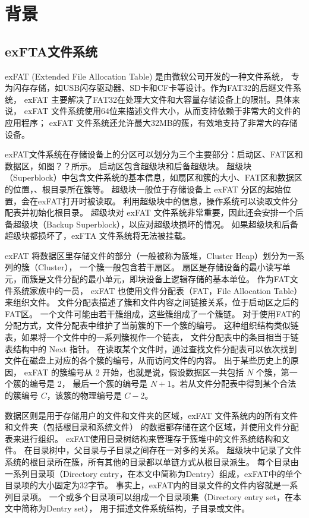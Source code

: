 
\chapter{背景}
\section{exFTA文件系统}
exFAT (Extended File Allocation Table)\parencite{exFAT} 是由微软公司开发的一种文件系统，
专为闪存存储，如USB闪存驱动器、SD卡和CF卡等设计。作为FAT32的后继文件系统，
exFAT 主要解决了FAT32在处理大文件和大容量存储设备上的限制。具体来说，
exFAT 文件系统使用64位来描述文件大小，从而支持依赖于非常大的文件的应用程序；
exFAT 文件系统还允许最大32MB的簇，有效地支持了非常大的存储设备。

exFAT文件系统在存储设备上的分区可以划分为三个主要部分：启动区、FAT区和数据区，如图？？所示。
启动区包含超级块和后备超级块。
超级块（Superblock）中包含文件系统的基本信息，如扇区和簇的大小、FAT区和数据区的位置，、根目录所在簇等。
超级块一般位于存储设备上 exFAT 分区的起始位置，会在exFAT打开时被读取。
利用超级块中的信息，操作系统可以读取文件分配表并初始化根目录。
超级块对 exFAT 文件系统非常重要，因此还会安排一个后备超级块（Backup Superblock），以应对超级块损坏的情况。
如果超级块和后备超级块都损坏了，exFTA 文件系统将无法被挂载。

exFAT 将数据区里存储文件的部分（一般被称为簇堆，Cluster Heap）划分为一系列的簇（Cluster），
一个簇一般包含若干扇区。
扇区是存储设备的最小读写单元，而簇是文件分配的最小单元，即块设备上逻辑存储的基本单位。
作为FAT文件系统家族中的一员， exFAT 也使用文件分配表（FAT，File Allocation Table）来组织文件。
文件分配表描述了簇和文件内容之间链接关系，位于启动区之后的FAT区。
一个文件可能由若干簇组成，这些簇组成了一个簇链。
对于使用FAT的分配方式，文件分配表中维护了当前簇的下一个簇的编号。
这种组织结构类似链表，如果将一个文件中的一系列簇视作一个链表，
文件分配表中的条目相当于链表结构中的 Next 指针。
在读取某个文件时，通过查找文件分配表可以依次找到文件在磁盘上对应的各个簇的编号，从而访问文件的内容。
出于某些历史上的原因， exFAT 的簇编号从 2 开始，也就是说，假设数据区一共包括 $ N $ 个簇，第一个簇的编号是 2，
最后一个簇的编号是 $ N + 1 $。若从文件分配表中得到某个合法的簇编号 $ C $，该簇的物理编号是 $ C - 2 $。

数据区则是用于存储用户的文件和文件夹的区域，exFAT 文件系统内的所有文件和文件夹（包括根目录和系统文件）
的数据都存储在这个区域，并使用文件分配表来进行组织。
exFAT使用目录树结构来管理存于簇堆中的文件系统结构和文件。
在目录树中，父目录与子目录之间存在一对多的关系。
超级块中记录了文件系统的根目录所在簇，所有其他的目录都以单链方式从根目录派生。
每个目录由一系列目录项（Directory entry，在本文中简称为Dentry）组成，exFAT中的单个目录项的大小固定为32字节。
事实上，exFAT内的目录文件的文件内容就是一系列目录项。
一个或多个目录项可以组成一个目录项集（Directory entry set，在本文中简称为Dentry set），
用于描述文件系统结构，子目录或文件。

